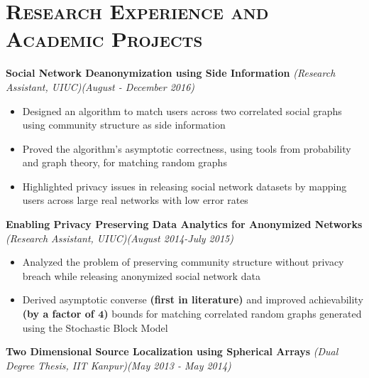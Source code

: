 \documentclass [letterpaper,10pt]{article}
\newcommand{\NewPart}[1]{\section*{\large\textsc{#1}}}
\begin{document}
\vspace{-15pt}
\NewPart{Research Experience and Academic Projects}{}
\textbf{Social Network Deanonymization using Side Information} \emph{(Research Assistant, UIUC)}\hfill\emph{(August - December 2016)}\\
\vspace{-16pt}
\begin{itemize} \itemsep -2.5pt
	\item Designed an algorithm to match users across two correlated social graphs using community structure as side information
	\item Proved the algorithm's asymptotic correctness, using tools from probability and graph theory, for matching random graphs 
	\item Highlighted privacy issues in releasing social network datasets by mapping users across large real networks with low error rates
\end{itemize}
\textbf{Enabling Privacy Preserving Data Analytics for Anonymized Networks} \emph{(Research Assistant, UIUC)}\hfill \emph{(August 2014-July 2015)}\\
\vspace{-16pt}
\begin{itemize} \itemsep -2.5pt
	\item Analyzed the problem of preserving community structure without privacy breach while releasing anonymized social network data 
	\item Derived asymptotic converse \textbf{(first in literature)} and improved achievability \textbf{(by a factor of $\mathbf{4}$)} bounds for matching correlated random graphs generated using the Stochastic Block Model
\end{itemize}
\textbf{Two Dimensional Source Localization using Spherical Arrays} \emph{(Dual Degree Thesis, IIT Kanpur)}\hfill\emph{(May 2013 - May 2014)}\\
\end{document}
